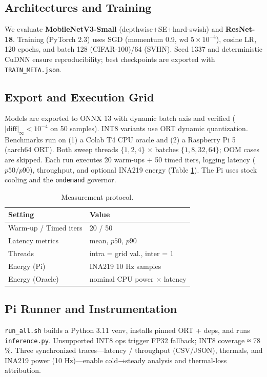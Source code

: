 \documentclass{article}
\begin{document}
\subsection{Architectures and Training}
\label{sec:arch-train}
We evaluate \textbf{MobileNetV3-Small} (depthwise+SE+hard-swish) and \textbf{ResNet-18}.  
Training (PyTorch 2.3) uses SGD (momentum 0.9, wd $5{\times}10^{-4}$), cosine LR, 120 epochs, and batch 128 (CIFAR-100)/64 (SVHN).  
Seed 1337 and deterministic CuDNN ensure reproducibility; best checkpoints are exported with \texttt{TRAIN\_META.json}.

\subsection{Export and Execution Grid}
\label{sec:export}
Models are exported to ONNX 13 with dynamic batch axis and verified ($|\text{diff}|_\infty<10^{-4}$ on 50 samples).  
INT8 variants use ORT dynamic quantization.  
Benchmarks run on (1) a Colab T4 CPU oracle and (2) a Raspberry Pi 5 (aarch64 ORT).  
Both sweep threads $\{1,2,4\}$ × batches $\{1,8,32,64\}$; OOM cases are skipped.  
Each run executes 20 warm-ups + 50 timed iters, logging latency ($p50/p90$), throughput, and optional INA219 energy (Table \ref{tab:measure-protocol}).  
The Pi uses stock cooling and the \texttt{ondemand} governor.

\begin{table}[h]
\centering
\small
\begin{tabular}{l l}
\toprule
Setting & Value \\
\midrule
Warm-up / Timed iters & 20 / 50 \\
Latency metrics & mean, $p50$, $p90$ \\
Threads & intra = grid val., inter = 1 \\
Energy (Pi) & INA219 10 Hz samples \\
Energy (Oracle) & nominal CPU power × latency \\
\bottomrule
\end{tabular}
\caption{Measurement protocol.}
\label{tab:measure-protocol}
\end{table}

\subsection{Pi Runner and Instrumentation}
\label{sec:pi-runner}
\texttt{run\_all.sh} builds a Python 3.11 venv, installs pinned ORT + deps, and runs \texttt{inference.py}.  
Unsupported INT8 ops trigger FP32 fallback; INT8 coverage ≈ 78 \%.  
Three synchronized traces—latency / throughput (CSV/JSON), thermals, and INA219 power (10 Hz)—enable cold→steady analysis and thermal-loss attribution.
\end{document}
